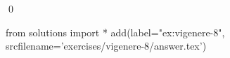 
\begin{ex} 
  \label{ex:vigenere-8}
  
  \qed
\end{ex} 
\begin{python0}
from solutions import *
add(label="ex:vigenere-8",
    srcfilename='exercises/vigenere-8/answer.tex') 
\end{python0}

